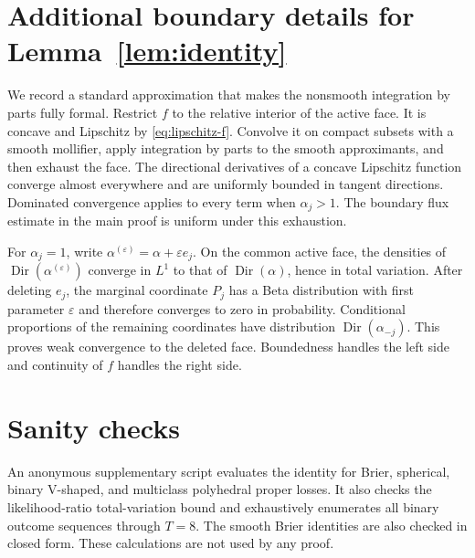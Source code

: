 \documentclass{article}
\theoremstyle{definition}
\theoremstyle{remark}
\newcommand{\Dir}{\operatorname{Dir}}
\begin{document}
\section{Additional boundary details for Lemma~\ref{lem:identity}}

We record a standard approximation that makes the nonsmooth integration by parts fully formal.  Restrict $f$ to the relative interior of the active face. It is concave and Lipschitz by \eqref{eq:lipschitz-f}.  Convolve it on compact subsets with a smooth mollifier, apply integration by parts to the smooth approximants, and then exhaust the face.  The directional derivatives of a concave Lipschitz function converge almost everywhere and are uniformly bounded in tangent directions.  Dominated convergence applies to every term when $\alpha_j>1$.  The boundary flux estimate in the main proof is uniform under this exhaustion.

For $\alpha_j=1$, write $\alpha^{(\varepsilon)}=\alpha+\varepsilon e_j$.  On the common active face, the densities of $\Dir(\alpha^{(\varepsilon)})$ converge in $L^1$ to that of $\Dir(\alpha)$, hence in total variation.  After deleting $e_j$, the marginal coordinate $P_j$ has a Beta distribution with first parameter $\varepsilon$ and therefore converges to zero in probability.  Conditional proportions of the remaining coordinates have distribution $\Dir(\alpha_{-j})$.  This proves weak convergence to the deleted face.  Boundedness handles the left side and continuity of $f$ handles the right side.

\section{Sanity checks}

An anonymous supplementary script evaluates the identity for Brier, spherical, binary V-shaped, and multiclass polyhedral proper losses.  It also checks the likelihood-ratio total-variation bound and exhaustively enumerates all binary outcome sequences through $T=8$.  The smooth Brier identities are also checked in closed form.  These calculations are not used by any proof.
\end{document}
